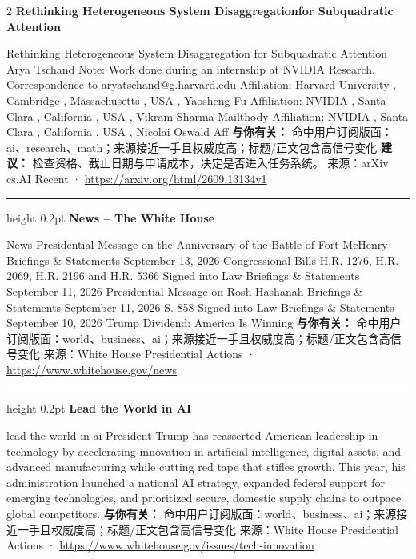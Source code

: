 \documentclass[10.5pt]{ctexart}
\begin{document}
\begin{multicols}{2}
{\large\bfseries Rethinking Heterogeneous System Disaggregationfor Subquadratic Attention}\par
Rethinking Heterogeneous System Disaggregation for Subquadratic Attention Arya Tschand Note: Work done during an internship at NVIDIA Research. Correspondence to aryatschand@g.harvard.edu Affiliation: Harvard University , Cambridge , Massachusetts , USA , Yaosheng Fu Affiliation: NVIDIA , Santa Clara , California , USA , Vikram Sharma Mailthody Affiliation: NVIDIA , Santa Clara , California , USA , Nicolai Oswald Aff
\textbf{与你有关：} 命中用户订阅版面：ai、research、math；来源接近一手且权威度高；标题/正文包含高信号变化
\textbf{建议：} 检查资格、截止日期与申请成本，决定是否进入任务系统。
{\footnotesize\color{ormuted} 来源：arXiv cs.AI Recent · \url{https://arxiv.org/html/2609.13134v1}}
\vspace{2mm}
\hrule height 0.2pt
\vspace{2mm}
{\large\bfseries News – The White House}\par
News Presidential Message on the Anniversary of the Battle of Fort McHenry Briefings \& Statements September 13, 2026 Congressional Bills H.R. 1276, H.R. 2069, H.R. 2196 and H.R. 5366 Signed into Law Briefings \& Statements September 11, 2026 Presidential Message on Rosh Hashanah Briefings \& Statements September 11, 2026 S. 858 Signed into Law Briefings \& Statements September 10, 2026 Trump Dividend: America Is Winning
\textbf{与你有关：} 命中用户订阅版面：world、business、ai；来源接近一手且权威度高；标题/正文包含高信号变化
{\footnotesize\color{ormuted} 来源：White House Presidential Actions · \url{https://www.whitehouse.gov/news}}
\vspace{2mm}
\hrule height 0.2pt
\vspace{2mm}
{\large\bfseries Lead the World in AI}\par
lead the world in ai President Trump has reasserted American leadership in technology by accelerating innovation in artificial intelligence, digital assets, and advanced manufacturing while cutting red tape that stifles growth. This year, his administration launched a national AI strategy, expanded federal support for emerging technologies, and prioritized secure, domestic supply chains to outpace global competitors.
\textbf{与你有关：} 命中用户订阅版面：world、business、ai；来源接近一手且权威度高；标题/正文包含高信号变化
{\footnotesize\color{ormuted} 来源：White House Presidential Actions · \url{https://www.whitehouse.gov/issues/tech-innovation}}

\end{multicols}
\end{document}
